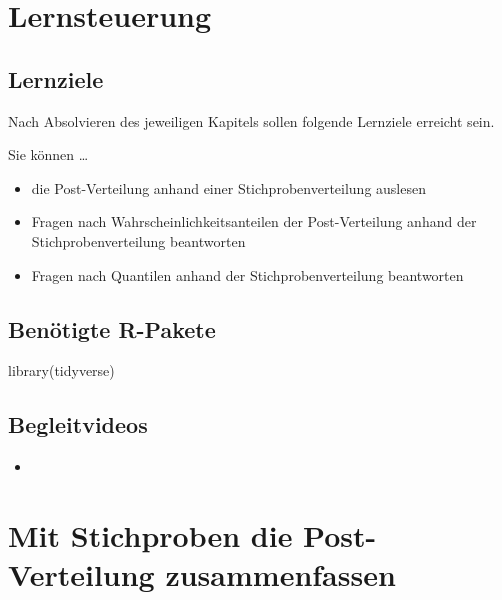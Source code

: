 \documentclass[
  a4paper,
  DIV=11]{scrreprt}
\newenvironment{Shaded}{\begin{snugshade}}{\end{snugshade}}
\newcommand{\FunctionTok}[1]{\textcolor[rgb]{0.28,0.35,0.67}{#1}}
\newcommand{\NormalTok}[1]{\textcolor[rgb]{0.00,0.23,0.31}{#1}}
\providecommand{\tightlist}{%
  \setlength{\itemsep}{0pt}\setlength{\parskip}{0pt}}\usepackage{longtable,booktabs,array}
\theoremstyle{definition}
\theoremstyle{remark}
\begin{document}
\hypertarget{lernsteuerung-4}{%
\section{Lernsteuerung}\label{lernsteuerung-4}}

\hypertarget{lernziele-5}{%
\subsection{Lernziele}\label{lernziele-5}}

Nach Absolvieren des jeweiligen Kapitels sollen folgende Lernziele
erreicht sein.

Sie können \ldots{}

\begin{itemize}
\tightlist
\item
  die Post-Verteilung anhand einer Stichprobenverteilung auslesen
\item
  Fragen nach Wahrscheinlichkeitsanteilen der Post-Verteilung anhand der
  Stichprobenverteilung beantworten
\item
  Fragen nach Quantilen anhand der Stichprobenverteilung beantworten
\end{itemize}

\hypertarget{benuxf6tigte-r-pakete-2}{%
\subsection{Benötigte R-Pakete}\label{benuxf6tigte-r-pakete-2}}

\begin{Shaded}
\begin{Highlighting}[]
\FunctionTok{library}\NormalTok{(tidyverse)}
\end{Highlighting}
\end{Shaded}

\hypertarget{begleitvideos-4}{%
\subsection{Begleitvideos}\label{begleitvideos-4}}

\begin{itemize}
\tightlist
\item
  \href{}{}
\end{itemize}

\hypertarget{mit-stichproben-die-post-verteilung-zusammenfassen}{%
\section{Mit Stichproben die Post-Verteilung
zusammenfassen}\label{mit-stichproben-die-post-verteilung-zusammenfassen}}
\end{document}
